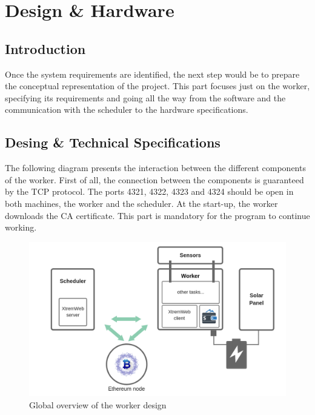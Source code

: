 

\chapter{Design \& Hardware}


\section{Introduction}
    Once the system requirements are identified, the next step would be to prepare the conceptual representation
    of the project. This part focuses just on the worker, specifying its requirements and going all the way
    from the software and the communication with the scheduler to the hardware specifications.

\section{Desing \& Technical Specifications}

    The following diagram presents the interaction between the different components of the worker.
    First of all, the connection between the components is guaranteed by the TCP protocol.
    The ports 4321, 4322, 4323 and 4324 should be open in both machines, the worker and the scheduler.
    At the start-up, the worker downloads the CA certificate. This part is mandatory for the program
    to continue working.

    \clearpage

    \begin{figure}[!h]\centering
        \includegraphics[width=.9\columnwidth]{5-Design/figs/worker-diagram.png}
        \caption{Global overview of the worker design}
    \end{figure}

